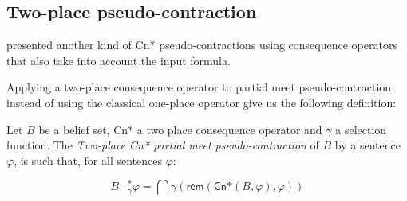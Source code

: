\subsection{Two-place pseudo-contraction}

\citeauthor{Matos2021} presented another kind of \textsf{Cn*} pseudo-contractions using consequence operators that also take into account the input formula. 

Applying a two-place consequence operator to partial meet pseudo-contraction instead of using the classical one-place operator give us the following definition:

\begin{definition}
    Let $B$ be a belief set, \textsf{Cn*} a two place consequence operator and $\gamma$ a selection function. The \textit{Two-place \textsf{Cn*} partial meet pseudo-contraction} of $B$ by a sentence $\varphi$, is such that, for all sentences $\varphi$:

    $$B -^{*}_{\gamma} \varphi = \bigcap \gamma(\textsf{rem}(\textsf{Cn*}(B, \varphi), \varphi))$$
\end{definition}